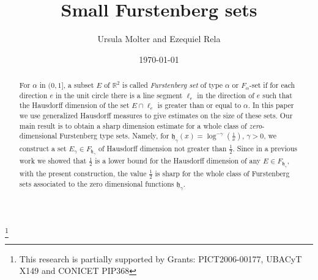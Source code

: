 \documentclass[11pt,a4paper]{amsart}
\begin{document}
\date{\today}

\newtheorem{theorem}{Theorem}[section]
\newtheorem{lemma}[theorem]{Lemma}
\newtheorem{corollary}[theorem]{Corollary}
\newtheorem{proposition}[theorem]{Proposition}
\newtheorem{claim}[theorem]{Claim}

\theoremstyle{definition}
\newtheorem{definition}[theorem]{Definition}
\newtheorem{example}[theorem]{Example}
\newtheorem{remark}[theorem]{Remark}

\title{Small Furstenberg sets}

\author{Ursula Molter and Ezequiel Rela}

\address{Departamento de
Matem\'atica \\ Facultad de Ciencias Exactas y Naturales\\
Universidad de Buenos Aires\\ Ciudad Universitaria, Pabell\'on
I\\ 1428 Capital Federal\\ ARGENTINA\\ and IMAS - CONICET, Argentina}
 

\thanks{This research  is partially supported by
Grants: PICT2006-00177, UBACyT X149 and CONICET PIP368}

\begin{abstract}
For $\alpha$ in $(0,1]$, a subset $E$ of ${\mathbb{R}^{2}}$ is called
\textit{Furstenberg set} of type $\alpha$ or $F_\alpha$-set if
for each direction $e$ in the unit circle there is a line segment
$\ell_e$ in the direction of $e$ such that the Hausdorff
dimension of the set $E\cap\ell_e$ is greater than or equal to
$\alpha$. In this paper we use generalized Hausdorff measures 
to give estimates on the size of these sets.
Our main result is to obtain a sharp dimension estimate for a whole class of {\em zero}-dimensional Furstenberg type sets. Namely, for
$\mathfrak{h}_\gamma(x)=\log^{-\gamma}(\frac{1}{x})$, $\gamma>0$, we
construct a set $E_\gamma\in F_{\mathfrak{h}_\gamma}$ of Hausdorff
dimension not greater than $\frac{1}{2}$.  Since in a previous work we showed that    $\frac{1}{2}$ is a lower bound  for the
Hausdorff dimension of any $E\in F_{\mathfrak{h}_\gamma}$, with
the present construction, the value $\frac{1}{2}$ is sharp for
the whole class of Furstenberg sets associated to the zero
dimensional functions $\mathfrak{h}_\gamma$.
\end{abstract}
\end{document}
